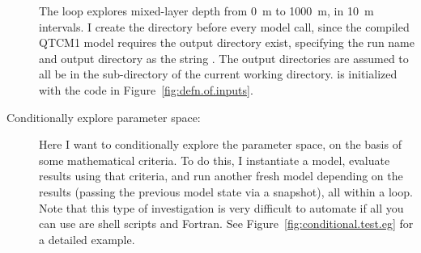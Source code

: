 \begin{description}
\begin{htmlonly}
\begin{center}
\end{center}
\end{htmlonly}


	The loop explores mixed-layer depth  from 0~m to
        1000~m, in 10~m intervals.  I create the 
	directory before every model call, since the compiled QTCM1 model
	requires the output directory exist, specifying the run name
	and output directory as the string .
	The output directories are assumed to all be in the 
	sub-directory of the current working directory.
	 is initialized with the code in
	Figure~\ref{fig:defn.of.inputs}.


\item[Conditionally explore parameter space:]
	Here I want to 
	conditionally explore the parameter space, on the basis of
	some mathematical criteria.
	To do this, I
	instantiate a model, evaluate results using
	that criteria, and run another fresh model depending on
	the results (passing the previous model state via a snapshot),
	all within a  loop.
	Note that this type of investigation is very difficult to 
	automate if all you can use are shell scripts and
	Fortran.
	See Figure~\ref{fig:conditional.test.eg} for a detailed
	example.



\end{description}
